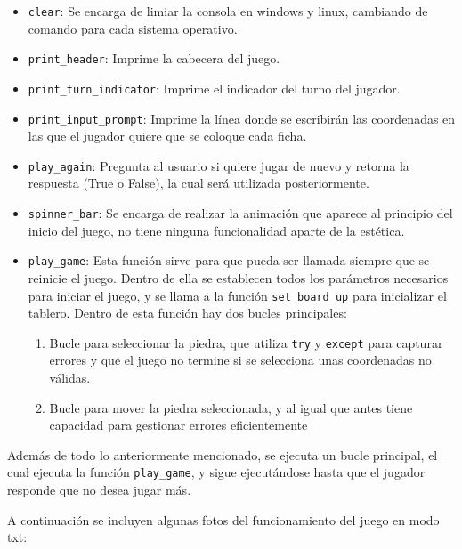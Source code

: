 \documentclass[a4paper,12pt]{article}
\begin{document}
\begin{itemize}
    \item \texttt{clear}: Se encarga de limiar la consola en windows y linux, cambiando de comando para cada sistema operativo.
    \item \texttt{print\_header}: Imprime la cabecera del juego.
    \item \texttt{print\_turn\_indicator}: Imprime el indicador del turno del jugador.
    \item \texttt{print\_input\_prompt}: Imprime la línea donde se escribirán las coordenadas en las que el jugador quiere que se coloque cada ficha.
    \item \texttt{play\_again}: Pregunta al usuario si quiere jugar de nuevo y retorna la respuesta (True o False), la cual será utilizada posteriormente. 
    \item \texttt{spinner\_bar}: Se encarga de realizar la animación que aparece al principio del inicio del juego, no tiene ninguna funcionalidad aparte de la estética.
    \item \texttt{play\_game}: Esta función sirve para que pueda ser llamada siempre que se reinicie el juego. Dentro de ella se establecen todos los parámetros necesarios 
    para iniciar el juego, y se llama a la función \texttt{set\_board\_up} para inicializar el tablero. Dentro de esta función hay dos bucles principales:
    \begin{enumerate}
        \item Bucle para seleccionar la piedra, que utiliza \texttt{try} y \texttt{except} para capturar errores y que el juego no termine si se selecciona unas coordenadas 
        no válidas.
        \item Bucle para mover la piedra seleccionada, y al igual que antes tiene capacidad para gestionar errores eficientemente
    \end{enumerate}
\end{itemize}

\vspace{\baselineskip}
Además de todo lo anteriormente mencionado, se ejecuta un bucle principal, el cual ejecuta la función \texttt{play\_game}, y sigue ejecutándose hasta que el jugador responde que no 
desea jugar más.

\vspace{\baselineskip}
A continuación se incluyen algunas fotos del funcionamiento del juego en modo txt:
\end{document}
